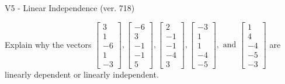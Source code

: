 \begin{exercise}
  \begin{exerciseTitle}V5 - Linear Independence (ver. 718)\end{exerciseTitle}
  \begin{exerciseStatement}
    Explain why the vectors \(\left[\begin{array}{r}
3 \\
1 \\
-6 \\
1 \\
-3
\end{array}\right] , \left[\begin{array}{r}
-6 \\
3 \\
-1 \\
-1 \\
5
\end{array}\right] , \left[\begin{array}{r}
2 \\
-1 \\
-1 \\
-4 \\
3
\end{array}\right] , \left[\begin{array}{r}
-3 \\
1 \\
1 \\
-4 \\
-5
\end{array}\right] , \text{ and } \left[\begin{array}{r}
1 \\
4 \\
-4 \\
-5 \\
-3
\end{array}\right]\) are linearly dependent or linearly independent.	



\end{exerciseStatement}
\end{exercise}
